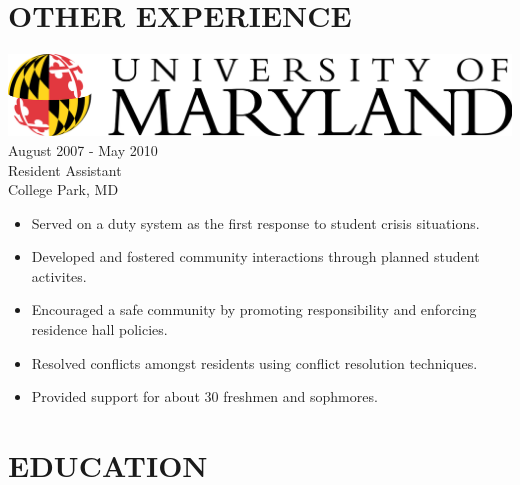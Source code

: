\documentclass[12pt, line, margin]{res}
\begin{document}
\begin{resume}
\section{OTHER EXPERIENCE} {\sl \includegraphics[scale=0.07]{resume_images/UMD_primary[Converted].png}} \hfill August 2007 - May 2010 \\
                Resident Assistant \\
                College Park, MD
                 \begin{itemize}  \itemsep -2pt %
                 \item   Served on a duty system as the first response to student crisis situations.
                 \item   Developed and fostered community interactions through planned student activites.
	         \item   Encouraged a safe community by promoting responsibility and enforcing residence hall policies.
	         \item   Resolved conflicts amongst residents using conflict resolution \newline
	                    techniques.
	         \item   Provided support for about 30 freshmen and sophmores.
                \end{itemize}

\section{EDUCATION}


\end{resume}
\end{document}
